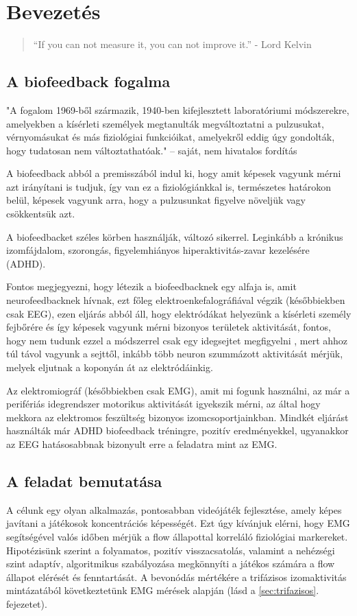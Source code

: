 \section{Bevezetés}
\begin{quote}
``If you can not measure it, you can not improve it.'' - Lord Kelvin
\end{quote}
\subsection{A biofeedback fogalma}
\label{section:history}

"A fogalom 1969-ből származik, 1940-ben kifejlesztett laboratóriumi módszerekre, amelyekben a kísérleti személyek megtanulták megváltoztatni a pulzusukat, vérnyomásukat és más fiziológiai funkcióikat, amelyekről eddig úgy gondolták, hogy tudatosan nem változtathatóak." \cite{BIOFEEDBACK-OVERVIEW} -- saját, nem hivatalos fordítás

A biofeedback abból a premisszából indul ki, hogy amit képesek vagyunk mérni azt irányítani is tudjuk, így van ez a fiziológiánkkal is, természetes határokon belül, képesek vagyunk arra, hogy a pulzusunkat figyelve növeljük vagy csökkentsük azt. 


A biofeedbacket széles körben használják, változó sikerrel. Leginkább a krónikus izomfájdalom, szorongás, figyelemhiányos hiperaktivitás-zavar kezelésére (ADHD). \cite{FRANK-CATEGORIES-OF-EFFICACY}

Fontos megjegyezni, hogy létezik a biofeedbacknek egy alfaja is, amit neurofeedbacknek hívnak, ezt főleg elektroenkefalográfiával végzik (későbbiekben csak EEG), ezen eljárás abból áll, hogy elektródákat helyezünk a kísérleti személy fejbőrére és így képesek vagyunk mérni bizonyos területek aktivitását, fontos, hogy nem tudunk ezzel a módszerrel csak egy idegsejtet megfigyelni \cite{BRITTON-EEG-INTRO}, mert ahhoz túl távol vagyunk a sejttől, inkább több neuron szummázott aktivitását mérjük, melyek eljutnak a koponyán át az elektródáinkig.

Az elektromiográf (későbbiekben csak EMG), amit mi fogunk használni, az már a perifériás idegrendszer motorikus aktivitását igyekszik mérni, az által hogy mekkora az elektromos feszültség bizonyos izomcsoportjainkban. \cite{EMG-DEF} Mindkét eljárást használták már ADHD biofeedback tréningre, pozitív eredményekkel, ugyanakkor az EEG hatásosabbnak bizonyult erre a feladatra mint az EMG. \cite{EMG-VS-EEG}


\subsection{A feladat bemutatása}
\label{section:overview}
A célunk egy olyan alkalmazás, pontosabban videójáték fejlesztése, amely képes javítani a játékosok koncentrációs képességét. Ezt úgy kívánjuk elérni, hogy EMG segítségével valós időben mérjük a flow állapottal korreláló fiziológiai markereket. Hipotézisünk szerint a folyamatos, pozitív visszacsatolás, valamint a nehézségi szint adaptív, algoritmikus szabályozása megkönnyíti a játékos számára a flow állapot elérését és fenntartását.
A bevonódás mértékére a trifázisos izomaktivitás mintázatából következtetünk EMG mérések alapján (lásd a \ref{sec:trifazisos}. fejezetet).


